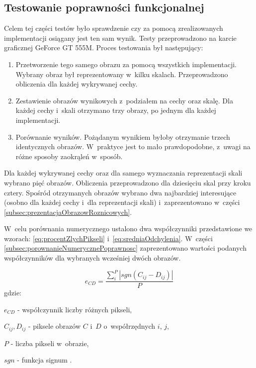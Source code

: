 \subsection{Testowanie poprawności funkcjonalnej}
\label{sec:testPoprawnosc}

Celem tej części testów było sprawdzenie czy za pomocą zrealizowanych implementacji osiągany jest ten sam wynik. Testy przeprowadzono na karcie graficznej GeForce GT 555M. Proces testowania był następujący:

\begin{enumerate}
\item Przetworzenie tego samego obrazu za pomocą wszystkich implementacji. Wybrany obraz był reprezentowany w~kilku skalach. Przeprowadzono obliczenia dla każdej wykrywanej cechy.
\item Zestawienie obrazów wynikowych z~podziałem na cechy oraz skalę. Dla każdej cechy i~skali otrzymano trzy obrazy, po jednym dla każdej implementacji.
\item Porównanie wyników. Pożądanym wynikiem byłoby otrzymanie trzech identycznych obrazów. W~praktyce jest to mało prawdopodobne, z~uwagi na różne sposoby zaokrąleń w~sposób.
\end{enumerate}

Dla każdej wykrywanej cechy oraz dla samego wyznaczania reprezentacji skali wybrano pięć obrazów. Obliczenia przeprowadzono dla dziesięciu skal przy kroku cztery. Spośród otrzymanych obrazów wybrano dwa najbardziej interesujące (osobno dla każdej cechy i~dla reprezentacji skali) i~zaprezentowano w~części \ref{subsec:prezentacjaObrazowRoznicowych}.

W~celu porównania numerycznego ustalono dwa współczynniki przedstawione we wzorach: \eqref{eq:procentZlychPikseli} i~\eqref{eq:sredniaOdchylenia}. W~części \ref{subsec:porownanieNumerycznePoprawnosc} zaprezentowano wartości podanych współczynników dla wybranych wcześniej dwóch obrazów.

\begin{equation}
\label{eq:procentZlychPikseli}
e_{CD} = \frac{\sum_{i}^{P}|sgn(C_{ij}-D_{ij})	|}{P}
\end{equation}
gdzie:

$ e_{CD} $ - współczynnik liczby różnych pikseli,

$ C_{ij}, D_{ij} $ - piksele obrazów $ C $ i~$ D $ o~współrzędnych $i$, $j$,

$ P $ - liczba pikseli w~obrazie,

$ sgn $ - funkcja signum \cite{Signum}.

